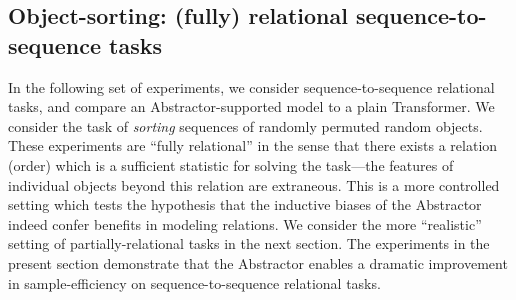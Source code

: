 \subsection{Object-sorting: (fully) relational sequence-to-sequence tasks}\label{ssec:experiments_object_sorting}

In the following set of experiments, we consider sequence-to-sequence relational tasks, and compare an Abstractor-supported model to a plain Transformer. We consider the task of \textit{sorting} sequences of randomly permuted random objects. These experiments are ``fully relational'' in the sense that there exists a relation (order) which is a sufficient statistic for solving the task---the features of individual objects beyond this relation are extraneous. This is a more controlled setting which tests the hypothesis that the inductive biases of the Abstractor indeed confer benefits in modeling relations. We consider the more ``realistic'' setting of partially-relational tasks in the next section. The experiments in the present section demonstrate that the Abstractor enables a dramatic improvement in sample-efficiency on sequence-to-sequence relational tasks.
